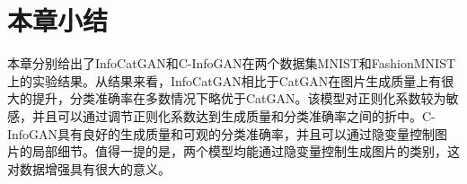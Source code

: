 \section{本章小结}
本章分别给出了InfoCatGAN和C-InfoGAN在两个数据集MNIST和FashionMNIST上的实验结果。从结果来看，InfoCatGAN相比于CatGAN在图片生成质量上有很大的提升，分类准确率在多数情况下略优于CatGAN。该模型对正则化系数较为敏感，并且可以通过调节正则化系数达到生成质量和分类准确率之间的折中。C-InfoGAN具有良好的生成质量和可观的分类准确率，并且可以通过隐变量控制图片的局部细节。值得一提的是，两个模型均能通过隐变量控制生成图片的类别，这对数据增强具有很大的意义。

